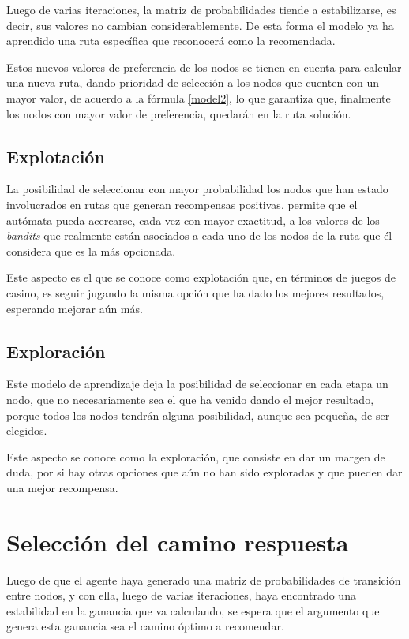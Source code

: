 Luego de varias iteraciones, la matriz de probabilidades tiende a estabilizarse, es decir, sus valores no cambian considerablemente. De esta forma el modelo ya ha aprendido una ruta específica que reconocerá como la recomendada.

Estos nuevos valores de preferencia de los nodos se tienen en cuenta para calcular una nueva ruta, dando prioridad de selección a los nodos que cuenten con un mayor valor, de acuerdo a la fórmula \ref{model2}, lo que garantiza que, finalmente los nodos con mayor valor de preferencia, quedarán en la ruta solución.

\subsection{Explotación}
La posibilidad de seleccionar con mayor probabilidad los nodos que han estado involucrados en rutas que generan recompensas positivas, permite que el autómata pueda acercarse, cada vez con mayor exactitud, a los valores de los \textit{bandits} que realmente están asociados a cada uno de los nodos de la ruta que él considera que es la más opcionada.

Este aspecto es el que se conoce como explotación que, en términos de juegos de casino, es seguir jugando la misma opción que ha dado los mejores resultados, esperando mejorar aún más.

\subsection{Exploración}
Este modelo de aprendizaje deja la posibilidad de seleccionar en cada etapa un nodo, que no necesariamente sea el que ha venido dando el mejor resultado, porque todos los nodos tendrán alguna posibilidad, aunque sea pequeña, de ser elegidos.

Este aspecto se conoce como la exploración, que consiste en dar un margen de duda, por si hay otras opciones que aún no han sido exploradas y que pueden dar una mejor recompensa.

\section{Selección del camino respuesta}

Luego de que el agente haya generado una matriz de probabilidades de transición entre nodos, y con ella, luego de varias iteraciones, haya encontrado una estabilidad en la ganancia que va calculando, se espera que el argumento que genera esta ganancia sea el camino óptimo a recomendar.

